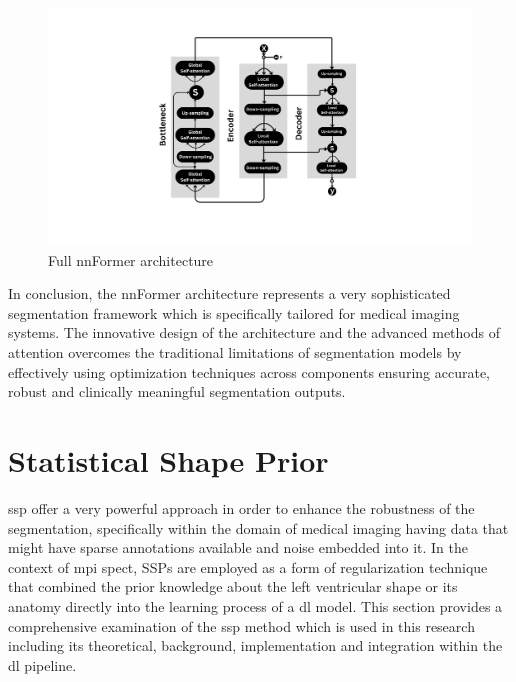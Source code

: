 \begin{figure}[htb!] 
\centering
\centering
\includegraphics[width=1\textwidth]{images/Architecture.png}
\caption{\centering Full nnFormer architecture}
\label{Fig:nnformer}
\end{figure}

In conclusion, the nnFormer architecture represents a very sophisticated segmentation framework which is specifically tailored for medical imaging systems. The innovative design of the architecture and the advanced methods of attention overcomes the traditional limitations of segmentation models by effectively using optimization techniques across components ensuring accurate, robust and clinically meaningful segmentation outputs.

\section{Statistical Shape Prior}
\gls{ssp} offer a very powerful approach in order to enhance the robustness of the segmentation, specifically within the domain of medical imaging having data that might have sparse annotations available and noise embedded into it. In the context of \gls{mpi} \gls{spect}, SSPs are employed as a form of regularization technique that combined the prior knowledge about the left ventricular shape or its anatomy directly into the learning process of a \gls{dl} model. This section provides a comprehensive examination of the \gls{ssp} method which is used in this research including its theoretical, background, implementation and integration within the \gls{dl} pipeline.

